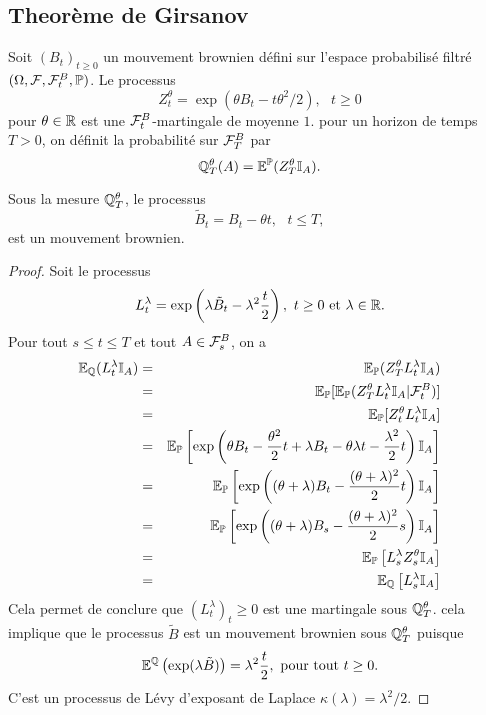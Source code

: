 \subsection{Theorème de Girsanov}
Soit $(B_t)_{t\geq 0}$ un mouvement brownien défini sur l'espace probabilisé filtré $(\Omega, \mathcal{F}, \mathcal{F}_t^B, \mathbb{P})$. 
Le processus 
$$
Z_t^\theta = \exp\left(\theta B_t - t\theta^2/2 \right),\text{ }t\geq 0
$$
pour $\theta\in \mathbb{R}$ est une $\mathcal{F}_t^B$-martingale de moyenne $1$. pour un horizon de temps $T>0$, on définit la probabilité sur $\mathcal{F}_T^B$ par
$$
\mathbb{Q}_T^\theta(A) = \mathbb{E}^{\mathbb{P}}(Z_T^\theta\mathbb{I}_A).
$$
\begin{theo}
Sous la mesure $\mathbb{Q}_T^\theta$, le processus 
$$
\tilde{B}_t = B_t - \theta t,\text{ }t\leq T,
$$
est un mouvement brownien.
\end{theo}
\begin{proof}
Soit le processus 
$$
L_t^\lambda = \exp\left(\lambda \tilde{B}_t - \lambda^2\frac{t}{2}\right),\text{ }t\geq 0\text{ et }\lambda\in\mathbb{R}.
$$
Pour tout $s\leq t\leq T$ et tout $A\in\mathcal{F}_s^B$, on a 
\begin{eqnarray*}
\mathbb{E}_{\mathbb{Q}}(L_t^\lambda\mathbb{I}_A) &=&\mathbb{E}_{\mathbb{P}}(Z_T^\theta L_t^\lambda\mathbb{I}_A)\\ 
&=&\mathbb{E}_{\mathbb{P}}[\mathbb{E}_{\mathbb{P}}(Z_T^\theta L_t^\lambda\mathbb{I}_A|\mathcal{F}_t^B)]\\ 
&=&\mathbb{E}_{\mathbb{P}}[Z_t^\theta L_t^\lambda\mathbb{I}_A]\\ 
&=& \mathbb{E}_{\mathbb{P}}\left[\exp\left(\theta B_t - \frac{\theta^2}{2}t + \lambda B_t - \theta\lambda t -\frac{\lambda^2}{2}t\right)\mathbb{I}_A\right]\\ 
&=& \mathbb{E}_{\mathbb{P}}\left[\exp\left((\theta+\lambda) B_t - \frac{(\theta+\lambda)^2}{2}t \right)\mathbb{I}_A\right]\\ 
&=& \mathbb{E}_{\mathbb{P}}\left[\exp\left((\theta+\lambda) B_s - \frac{(\theta+\lambda)^2}{2}s \right)\mathbb{I}_A\right]\\
&=& \mathbb{E}_{\mathbb{P}}\left[L^\lambda_sZ_s^\theta\mathbb{I}_A\right]\\
&=&\mathbb{E}_{\mathbb{Q}}\left[L^\lambda_s\mathbb{I}_A\right]
\end{eqnarray*}
Cela permet de conclure que $(L_t^\lambda)_t\geq 0$ est une martingale sous $\mathbb{Q}^\theta_T$. cela implique que le processus $\tilde{B}$ est un mouvement brownien sous $\mathbb{Q}^\theta_T$ puisque 
$$
\mathbb{E}^{\mathbb{Q}}\left(\exp(\lambda \tilde{B})\right) = \lambda^2\frac{t}{2},\text{ pour tout }t\geq 0.
$$
C'est un processus de Lévy d'exposant de Laplace $\kappa(\lambda) = \lambda^2/2$.
\end{proof}
